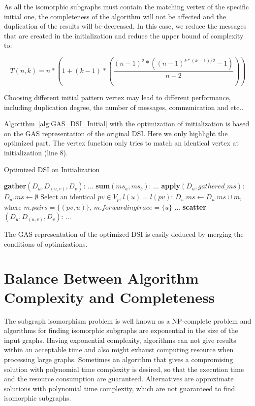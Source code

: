 As all the isomorphic subgraphs must contain the matching vertex of the specific initial one, the completeness of the algorithm will not be affected and the duplication of the results will be decreased. In this case, we reduce the messages that are created in the initialization and reduce the upper bound of complexity to:

\begin{equation}\label{eq:DSIComplexityOptimized}
	T(n,k) = n*(1+(k-1)*(\frac{(n-1)^2*((n-1)^{k*(k-1)/2}-1)}{n-2}))
\end{equation}


Choosing different initial pattern vertex may lead to different performance, including duplication degree, the number of messages, communication and etc.. 

Algorithm~\vref{alg:GAS_DSI_Initial} with the optimization of initialization is based on the GAS representation of the original DSI. Here we only highlight the optimized part. The vertex function only tries to match an identical vertex at initialization (line 8).

	\begin{Algorithmus}[H]
	\label{alg:GAS_DSI_Initial}
	\caption{Optimized DSI on Initialization}	
	\begin{algorithmic}[1]
	\State \textbf{gather}$(D_u, D_{(u,v)}, D_v)$: 
	\State ...
	\newline
	\State \textbf{sum}$(ms_a, ms_b)$:
	\State ...
	\newline
	\State \textbf{apply}$(D_u, gathered\_ms)$:
	\State $D_u.ms \leftarrow \emptyset$
		\State Select an identical $pv \in V_p, l(u)=l(pv)$: $D_u.ms \leftarrow D_u.ms \cup m$, where $m.pairs = \{(pv, u)\}$, $m.forwardingtrace = \{u\}$
	\State ...
	\EndIf
	\newline
	\State \textbf{scatter}$(D_u, D_{(u,v)}, D_v)$:
	\State ...
	\end{algorithmic}	
	\end{Algorithmus}
	
The GAS representation of the optimized DSI is easily deduced by merging the conditions of optimizations. 

\section{Balance Between Algorithm Complexity and Completeness}

The subgraph isomorphism problem is well known as a NP-complete problem and  algorithms for finding isomorphic subgraphs are exponential in
the size of the input graphs. Having exponential complexity, algorithms can not give results within an acceptable time and also might exhaust computing resource when processing large graphs. Sometimes an algorithm that gives a compromising solution with polynomial time complexity is desired, so that the execution time and the resource consumption are guaranteed. Alternatives are approximate solutions with polynomial time complexity, which are not guaranteed to find isomorphic subgraphs.

